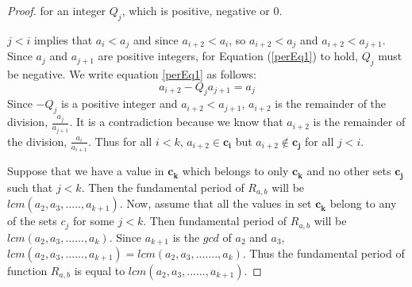 \documentclass[10pt,a4paper]{amsart}
\begin{document}
\begin{proof}
for an integer $Q_j$, which is positive, negative or $0$. 
\par $j<i$ implies that  $a_i<a_j$ and since $a_{i+2}<a_i$, so $a_{i+2}<a_j$ and $a_{i+2}<a_{j+1}$. Since $a_j$ and $a_{j+1}$ are positive integers, for Equation (\ref{perEq1}) to hold, $Q_j$ must be negative. We write equation \ref{perEq1} as follows:
\begin{equation}\label{perEq2}
    a_{i+2}-Q_ja_{j+1}=a_j
\end{equation}
Since $-Q_j$ is a positive integer and $a_{i+2}<a_{j+1}$, $a_{i+2}$ is the remainder of the division, $\frac{a_j}{a_{j+1}}$. It is a contradiction because we know that $a_{i+2}$ is the remainder of the division, $\frac{a_i}{a_{i+1}}$. Thus for all $i<k$, $a_{i+2}\in \mathbf{c_i}$ but $a_{i+2} \notin \mathbf{c_j}$ for all $j<i$. 
\par Suppose that we have a value in $\mathbf{c_k}$ which belongs to only $\mathbf{c_k}$ and no other sets $\mathbf{c_j}$ such that $j<k$. Then the fundamental period of $R_{a,b}$ will be $lcm(a_2,a_3,.....,a_{k+1})$. Now, assume that all the values in set $\mathbf{c_k}$ belong to any of the sets $c_j$ for some $j<k$. Then fundamental period of $R_{a,b}$ will be $lcm(a_2,a_3,......,a_{k})$. Since $a_{k+1}$ is the $gcd$ of $a_2$ and $a_3$, $lcm(a_2,a_3,......,a_{k+1})=lcm(a_2,a_3,.......,a_k)$. Thus the fundamental period of function $R_{a,b}$ is equal to $lcm(a_2,a_3,......,a_{k+1})$.
\end{proof}
\end{document}
